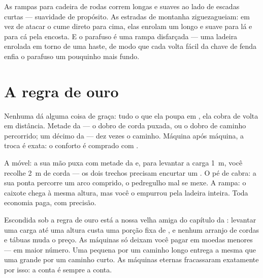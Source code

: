 \begin{example}\label{ex:g5:simple-machines:ramps}
As rampas para cadeira de rodas correm longas e suaves ao lado de
escadas curtas --- suavidade de propósito. As estradas de montanha
ziguezagueiam: em vez de atacar o cume direto para cima, elas
enrolam um  longo e suave para lá e para cá pela
encosta. E o parafuso é uma rampa disfarçada --- uma ladeira enrolada
em torno de uma haste, de modo que cada volta fácil da chave de fenda
enfia o parafuso um pouquinho mais fundo.
\end{example}

\section{A regra de ouro}

\begin{proposition}\label{prop:g5:simple-machines:golden}
Nenhuma  dá alguma coisa de graça: tudo o que ela
poupa em , ela cobra de volta em distância. Metade da  ---
o dobro de corda puxada, ou o dobro de caminho percorrido; um décimo
da  --- dez vezes o caminho. Máquina após máquina, a troca é
exata: o conforto é comprado com .
\end{proposition}

\begin{example}\label{ex:g5:simple-machines:check}
A  móvel: a sua mão puxa com metade da  e, para levantar
a carga \qty{1}{m}, você recolhe \qty{2}{m} de corda --- os dois
trechos precisam encurtar um . O pé de cabra: a sua ponta
percorre um arco comprido, o pedregulho mal se mexe. A rampa: o
caixote chega à mesma altura, mas você o empurrou pela ladeira
inteira. Toda economia paga, com precisão.
\end{example}

\begin{remark}\label{rem:g5:simple-machines:whygolden}
Escondida sob a regra de ouro está a nossa velha amiga do capítulo da
: levantar uma carga até uma altura custa uma porção fixa de
, e nenhum arranjo de cordas e tábuas muda o preço. As
máquinas só deixam você pagar em moedas menores --- em maior número.
Uma  pequena por um caminho longo entrega a mesma  que
uma  grande por um caminho curto. As máquinas eternas
fracassaram exatamente por isso: a conta é sempre a conta.
\end{remark}


